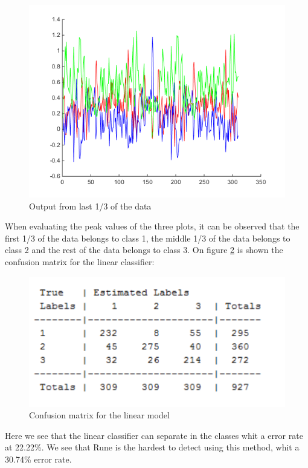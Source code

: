 \begin{figure}[H]
%
  \includegraphics[width=\linewidth]{billeder/oneofkval3}
  \caption{Output from last 1/3 of the data}\label{fig:oneofkval3}
\endminipage
\end{figure}
When evaluating the peak values of the three plots, it can be observed that the first 1/3 of the data belongs to class 1, the middle 1/3 of the data belongs to class 2 and the rest of the data belongs to class 3. On figure \ref{fig:conmatlin} is shown the confusion matrix for the linear classifier: 

\begin{figure}[H]
\centering
\includegraphics[scale=0.8]{billeder/conmatlin}
\caption{Confusion matrix for the linear model }
\label{fig:conmatlin}
\end{figure}

Here we see that the linear classifier can separate in the classes whit a error rate at 22.22\%. We see that Rune is the hardest to detect using this method, whit a 30.74\% error rate. 

